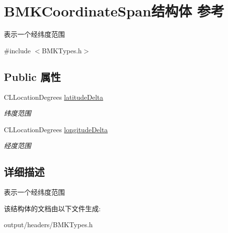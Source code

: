 \hypertarget{struct_b_m_k_coordinate_span}{}\section{B\+M\+K\+Coordinate\+Span结构体 参考}
\label{struct_b_m_k_coordinate_span}


表示一个经纬度范围  




{\ttfamily \#include $<$B\+M\+K\+Types.\+h$>$}

\subsection*{Public 属性}
\begin{DoxyCompactItemize}
\item 
\hypertarget{struct_b_m_k_coordinate_span_a759543f626366ce4fe599b8896f352a2}{}C\+L\+Location\+Degrees \hyperlink{struct_b_m_k_coordinate_span_a759543f626366ce4fe599b8896f352a2}{latitude\+Delta}\label{struct_b_m_k_coordinate_span_a759543f626366ce4fe599b8896f352a2}

\begin{DoxyCompactList}\small\item\em 纬度范围 \end{DoxyCompactList}\item 
\hypertarget{struct_b_m_k_coordinate_span_ab3bc7d18bbd0fce7c806c51f0e0df447}{}C\+L\+Location\+Degrees \hyperlink{struct_b_m_k_coordinate_span_ab3bc7d18bbd0fce7c806c51f0e0df447}{longitude\+Delta}\label{struct_b_m_k_coordinate_span_ab3bc7d18bbd0fce7c806c51f0e0df447}

\begin{DoxyCompactList}\small\item\em 经度范围 \end{DoxyCompactList}\end{DoxyCompactItemize}


\subsection{详细描述}
表示一个经纬度范围 

该结构体的文档由以下文件生成\+:\begin{DoxyCompactItemize}
\item 
output/headers/B\+M\+K\+Types.\+h\end{DoxyCompactItemize}
